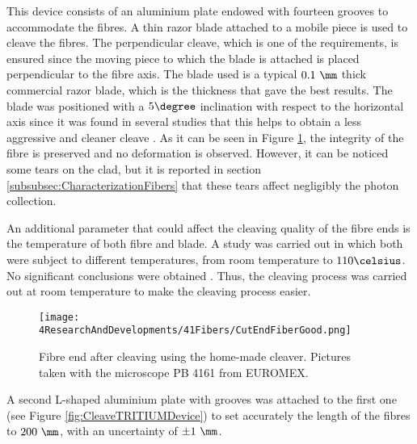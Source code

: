 This device consists of an aluminium plate endowed with fourteen grooves to accommodate the fibres. A thin razor blade attached to a mobile piece is used to cleave the fibres. The perpendicular cleave, which is one of the requirements, is ensured since the moving piece to which the blade is attached is placed perpendicular to the fibre axis. The blade used is a typical $0.1~\mm$ thick commercial razor blade, which is the thickness that gave the best results. The blade was positioned with a $5\degree$ inclination with respect to the horizontal axis since it was found in several studies that this helps to obtain a less aggressive and cleaner cleave \cite{AngleBlade, TemperatureBlade}. As it can be seen in Figure \ref{fig:CleavingFiberEnd}, the integrity of the fibre is preserved and no deformation is observed. However, it can be noticed some tears on the clad, but it is reported in section \ref{subsubsec:CharacterizationFibers} that these tears affect negligibly the photon collection. 

An additional parameter that could affect the cleaving quality of the fibre ends is the temperature of both fibre and blade. A study was carried out in which both were subject to different temperatures, from room temperature to $110\celsius$. No significant conclusions were obtained \cite{TFGAlberto}. Thus, the cleaving process was carried out at room temperature to make the cleaving process easier.

\begin{figure}[h]
\centering
\texttt{[image: 4ResearchAndDevelopments/41Fibers/CutEndFiberGood.png]}
\caption{Fibre end after cleaving using the home-made cleaver. Pictures taken with the microscope PB 4161 from EUROMEX.\label{fig:CleavingFiberEnd}}
\end{figure}

A second L-shaped aluminium plate with grooves was attached to the first one (see Figure \ref{fig:CleaveTRITIUMDevice}) to set accurately the length of the fibres to $200~\mm$, with an uncertainty of $\pm 1~\mm$.